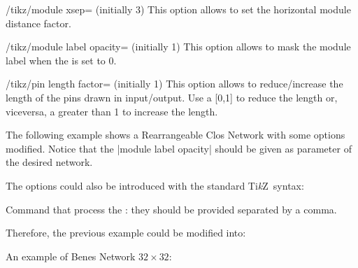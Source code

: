 \documentclass{ltxdoc} %
\newcommand\Tikz{Ti\textit kZ}
\begin{document}
\begin{key}{/tikz/module xsep= (initially 3)}
    This option allows to set the horizontal module distance factor.
\end{key}

\begin{key}{/tikz/module label opacity= (initially 1)}
    This option allows to mask the module label when the  is set to 0.
\end{key}

\begin{key}{/tikz/pin length factor= (initially 1)}
    This option allows to reduce/increase the length of the pins drawn in input/output. Use a  [0,1] to reduce the length or, viceversa, a  greater than 1 to increase the length.
\end{key}

The following example shows a Rearrangeable Clos Network with some options modified. Notice that the |module label opacity| should be given as parameter of the desired network.

\begin{codeexample}[]
\begin{tikzpicture}[N=9,r1=3,M=9,r3=3]
    \node[module size=0.5cm,pin length factor=0.5,
        module ysep=1, module xsep=1.25,
        clos rear={module label opacity=0}] {};
\end{tikzpicture}
\end{codeexample}

The options could also be introduced with the standard \Tikz\ syntax:
\begin{command}{{\tikzset}}
    Command that process the : they should be provided separated by a comma.
\end{command}
Therefore, the previous example could be modified into:
\begin{codeexample}[]
\tikzset{module size=0.5cm,pin length factor=0.5,
         module ysep=1, module xsep=1.25,}
\begin{tikzpicture}[N=9,r1=3,M=9,r3=3]
    \node[clos rear={module label opacity=0}] {};
\end{tikzpicture}
\end{codeexample}
An example of Benes Network $32 \times 32$:
\begin{codeexample}[]
\tikzset{module size=0.6cm,pin length factor=0.6,
         module ysep=0.9, module xsep=1.7,}
\begin{tikzpicture}[P=32]
    \node[benes] {};
\end{tikzpicture}
\end{codeexample}
\end{document}
